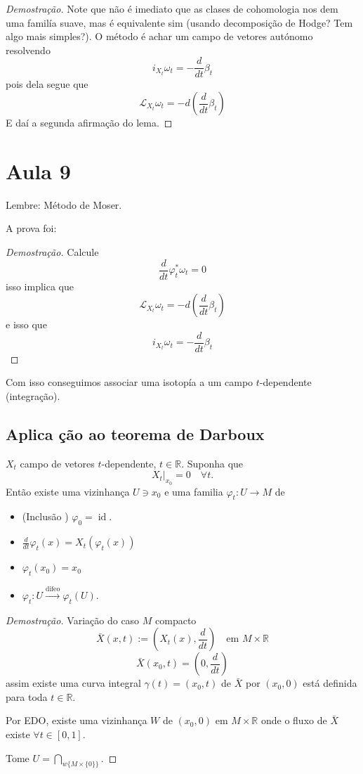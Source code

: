 \begin{proof}[Demostra\c c\~ao]
	Note que n\~ao \'e imediato que as clases de cohomologia nos dem uma famil\'ia suave, mas \'e equivalente sim (usando decomposi\c c\~ao de Hodge? Tem algo mais simples?). O m\'etodo \'e achar um campo de vetores aut\'onomo resolvendo
	\[i_{X_t}\omega_t=-\frac{d}{dt}\beta_t\]
	pois dela segue que
	\[\mathcal{L}_{X_t}\omega_t=-d\left( \frac{d}{dt}\beta_t \right)\]
	E da\'i a segunda afirma\c c\~ao do lema.
\end{proof}

\section{Aula 9}

Lembre: M\'etodo de Moser.
 
A prova foi:
\begin{proof}[Demostra\c c\~ao]
	Calcule
	\[\frac{d}{dt}\varphi^*_t\omega_t=0\]
	isso implica que
	\[\mathcal{L}_{X_t}\omega_t=-d\left( \frac{d}{dt}\beta_t \right)\]
	e isso que
	\[i_{X_t}\omega_t=-\frac{d}{dt}\beta_t\]
\end{proof}

Com isso conseguimos associar uma isotop\'ia a um campo $t$-dependente (integra\c c\~ao).

\subsection{Aplica \c c\~ao ao teorema de Darboux}

\begin{lemma}
	$X_t$ campo de vetores $t$-dependente, $t\in\mathbb{R}$. Suponha que
	\[X_t|_{x_0}=0\quad \forall t.\]
	Ent\~ao existe uma vizinhança $U\ni x_0$ e uma familia $\varphi_t:U\to M$ de 
	\begin{itemize}
		\item (Inclus\~ao ) $\varphi_0=\operatorname{id}$.
		\item $\frac{d}{dt}\varphi_t(x)=X_t(\varphi_t(x))$
		\item $\varphi_t(x_0)=x_0$
		\item $\varphi _t:U\overset{\operatorname{difeo}}{\longrightarrow}\varphi_t(U)$.
	\end{itemize}
\end{lemma}

\begin{proof}[Demostra\c c\~ao]
	Varia\c c\~ao do caso $M$ compacto
	\[\bar{X}(x,t):=\left( X_t(x),\frac{d}{dt}\right)\quad \text{em $M\times \mathbb{R}$} \]
	\[\bar{X}(x_0,t)=\left( 0,\frac{d}{dt} \right) \]
	assim existe uma curva integral $\gamma(t)=(x_0,t)$ de $ \bar{X}$ por $(x_0,0)$ est\'a definida para toda $t\in\mathbb{R}$.

	Por EDO, existe uma vizinhança $W$ de $(x_0,0)$ em $M\times \mathbb{R}$ onde o fluxo de $\bar{X}$ existe $\forall t\in[0,1]$.

	Tome $U=\bigcap_{w\{M\times \{0\}\}} $.
\end{proof}

